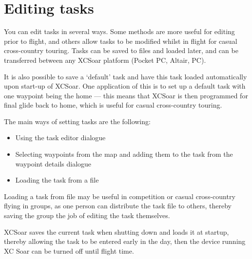 \section{Editing tasks}

You can edit tasks in several ways.  Some methods are more useful for
editing prior to flight, and others allow tasks to be modified whilst
in flight for casual cross-country touring.  Tasks can be saved to
files and loaded later, and can be transferred between any XCSoar
platform (Pocket PC, Altair, PC).

\tip It is also possible to save a `default' task and have this task loaded
automatically upon start-up of XCSoar.  One application of this is to
set up a default task with one waypoint being the home --- this means
that XCSoar is then programmed for final glide back to home, which is
useful for casual cross-country touring.

The main ways of setting tasks are the following:
\begin{itemize}
\item Using the task editor dialogue
\item Selecting waypoints from the map and adding them to the task from the
 waypoint details dialogue
\item Loading the task from a file
\end{itemize}

%

\tip Loading a task from file may be useful in competition or casual
cross-country flying in groups, as one person can distribute the task
file to others, thereby saving the group the job of editing the task
themselves.


XCSoar saves the current task when shutting down and loads it at
startup, thereby allowing the task to be entered early in the day,
then the device running XC Soar can be turned off until flight time.

